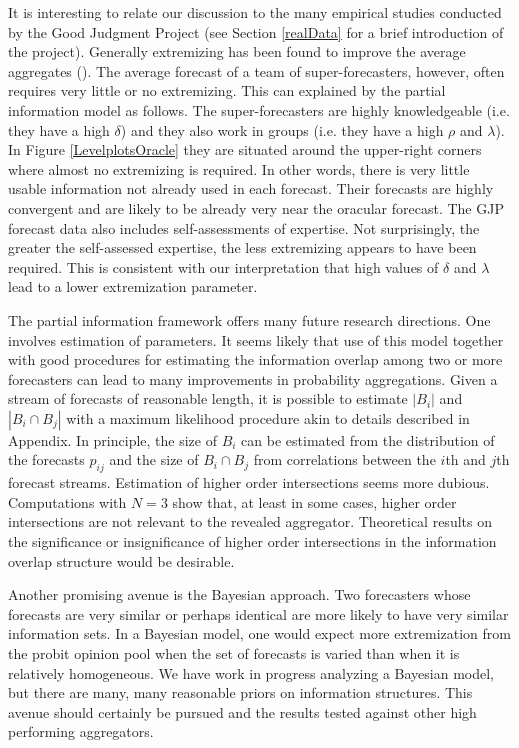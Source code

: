 \documentclass[11pt]{article}
\theoremstyle{definition}
\theoremstyle{definition}
\begin{document}
It is interesting to relate our discussion to the many empirical
studies conducted by the Good Judgment Project (see Section
\ref{realData} for a brief introduction of the project).  Generally
extremizing has been found to improve the average aggregates
(\citealt{mellers2014psychological, satopaa, satopaa2014probability}).
The average forecast of a team of super-forecasters, however, often
requires very little or no extremizing.  This can explained by the
partial information model as follows.  The super-forecasters are
highly knowledgeable (i.e. they have a high $\delta$) and they also
work in groups (i.e. they have a high $\rho$ and $\lambda$).  In
Figure \ref{LevelplotsOracle} they are situated around the upper-right
corners where almost no extremizing is required.  In other words,
there is very little usable information not already used in each
forecast.  Their forecasts are highly convergent and are likely to be
already very near the oracular forecast.  The GJP forecast data also
includes self-assessments of expertise.  Not surprisingly, the greater
the self-assessed expertise, the less extremizing appears to have been
required.  This is consistent with our interpretation that high values
of $\delta$ and $\lambda$ lead to a lower extremization parameter.

The partial information framework offers many future research
directions.  One involves estimation of parameters.  It seems likely
that use of this model together with good procedures for estimating
the information overlap among two or more forecasters can lead to many
improvements in probability aggregations. Given a stream of forecasts
of reasonable length, it is possible to estimate $|B_i|$ and $|B_i
\cap B_j|$ with a maximum likelihood procedure akin to details
described in Appendix. In principle, the size of $B_i$ can be
estimated from the distribution of the forecasts $p_{ij}$ and the size
of $B_i \cap B_j$ from correlations between the $i$th and $j$th
forecast streams.  Estimation of higher order intersections seems more
dubious.  Computations with $N=3$ show that, at least in some cases,
higher order intersections are not relevant to the revealed
aggregator.  Theoretical results on the significance or insignificance
of higher order intersections in the information overlap structure
would be desirable.

Another promising avenue is the Bayesian approach.  Two forecasters
whose forecasts are very similar or perhaps identical are more likely
to have very similar information sets.  In a Bayesian model, one would
expect more extremization from the probit opinion pool when the set of
forecasts is varied than when it is relatively homogeneous.  We have
work in progress analyzing a Bayesian model, but there are many, many
reasonable priors on information structures.  This avenue should
certainly be pursued and the results tested against other high
performing aggregators.
\end{document}
